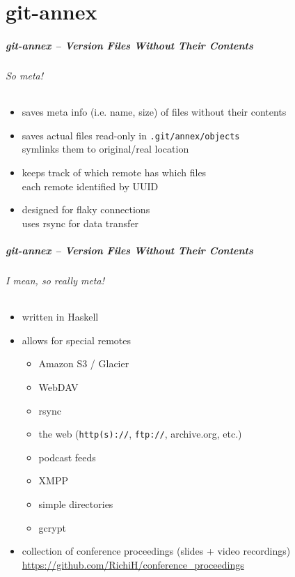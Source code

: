 \documentclass[english,hyperref={pdfpagelabels=false},aspectratio=169]{beamer}
\begin{document}
\part{git-annex}
\makepart

\begin{frame}[label=gitannex]
  \frametitle{git-annex -- Version Files Without Their Contents}
  \framesubtitle{So meta!}
  \begin{itemize}
    \item saves meta info (i.e. name, size) of files without their contents
    \item saves actual files read-only in \texttt{.git/annex/objects}\\
      {\scriptsize symlinks them to original/real location}
    \item keeps track of which remote has which files\\
      {\scriptsize each remote identified by UUID}
    \item designed for flaky connections\\
      {\scriptsize uses rsync for data transfer}
  \end{itemize}
\end{frame}

\begin{frame}
  \frametitle{git-annex -- Version Files Without Their Contents}
  \framesubtitle{I mean, so really meta!}
  \begin{itemize}
    \item written in Haskell
    \item allows for special remotes
      \begin{itemize}
        \item Amazon S3 / Glacier
        \item WebDAV
        \item rsync
        \item the web (\texttt{http(s)://}, \texttt{ftp://}, archive.org, etc.)
        \item podcast feeds
        \item XMPP
        \item simple directories
        \item gcrypt
      \end{itemize}
    \item collection of conference proceedings {\tiny(slides + video recordings)}\\
      {\scriptsize \url{https://github.com/RichiH/conference_proceedings}}
  \end{itemize}
\end{frame}
\end{document}
